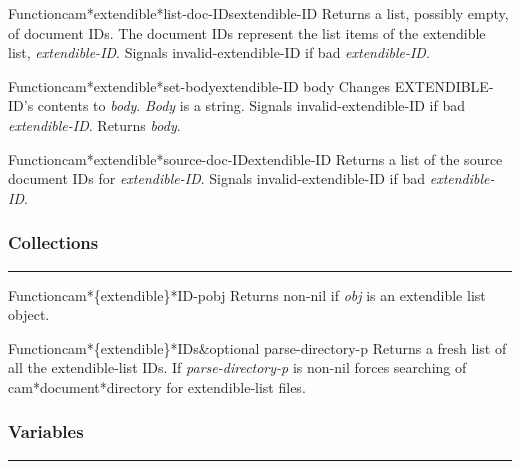 \begin{functiondoc}{Function}{cam*extendible*list-doc-IDs}{extendible-ID}
Returns a list, possibly empty, of document IDs.  The document IDs
represent the list items of the extendible list, {\em extendible-ID}.
Signals invalid-extendible-ID if bad {\em extendible-ID}.
\end{functiondoc}

\begin{functiondoc}{Function}{cam*extendible*set-body}{extendible-ID body}
Changes EXTENDIBLE-ID's contents to {\em body}.
{\em Body} is a string.
Signals invalid-extendible-ID if bad {\em extendible-ID}.
Returns {\em body}.
\end{functiondoc}

\begin{functiondoc}{Function}{cam*extendible*source-doc-ID}{extendible-ID}
Returns a list of the source document IDs for {\em extendible-ID}.
Signals invalid-extendible-ID if bad {\em extendible-ID}.
\end{functiondoc}


\subsubsection*{Collections}
\par\vspace*{0.00in}\par\hrule\par\medskip\par


\begin{functiondoc}{Function}{cam*\{extendible\}*ID-p}{obj}
Returns non-nil if {\em obj} is an extendible list object.
\end{functiondoc}

\begin{functiondoc}{Function}{cam*\{extendible\}*IDs}{\&optional parse-directory-p}
Returns a fresh list of all the extendible-list IDs.
If {\em parse-directory-p} is non-nil forces searching of cam*document*directory for 
extendible-list files.
\end{functiondoc}


\subsubsection*{Variables}
\par\vspace*{0.00in}\par\hrule\par\medskip\par


